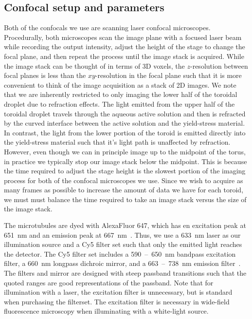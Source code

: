 \subsection{Confocal setup and parameters}
Both of the confocals we use are scanning laser confocal microscopes.
Procedurally, both microscopes scan the image plane with a focused laser beam while recording the output intensity, adjust the height of the stage to change the focal plane, and then repeat the process until the image stack is acquired.
While the image stack can be thought of in terms of 3D voxels, the $z$-resolution between focal planes is less than the $xy$-resolution in the focal plane such that it is more convenient to think of the image acquisition as a stack of 2D images.
We note that we are inherently restricted to only imaging the lower half of the toroidal droplet due to refraction effects.
The light emitted from the upper half of the toroidal droplet travels through the aqueous active solution and then is refracted by the curved interface between the active solution and the yield-stress material.
In contrast, the light from the lower portion of the toroid is emitted directly into the yield-stress material such that it's light path is unaffected by refraction.
However, even though we can in principle image up to the midpoint of the torus, in practice we typically stop our image stack below the midpoint.
This is because the time required to adjust the stage height is the slowest portion of the imaging process for both of the confocal microscopes we use.
Since we wish to acquire as many frames as possible to increase the amount of data we have for each toroid, we must must balance the time required to take an image stack versus the size of the image stack.

The microtubules are dyed with AlexaFluor 647, which has en excitation peak at 651~nm and an emission peak at 667~nm~\cite{RN264}.
Thus, we use a 633~nm laser as our illumination source and a Cy5 filter set such that only the emitted light reaches the detector.
The Cy5 filter set includes a 590~--~650~nm bandpass excitation filter, a 660~nm longpass dichroic mirror, and a 663~--~738~nm emission filter~\cite{RN263}.
The filters and mirror are designed with steep passband transitions such that the quoted ranges are good representations of the passband.
Note that for illumination with a laser, the excitation filter is unnecessary, but is standard when purchasing the filterset.
The excitation filter is necessary in wide-field fluorescence microscopy when illuminating with a white-light source.

